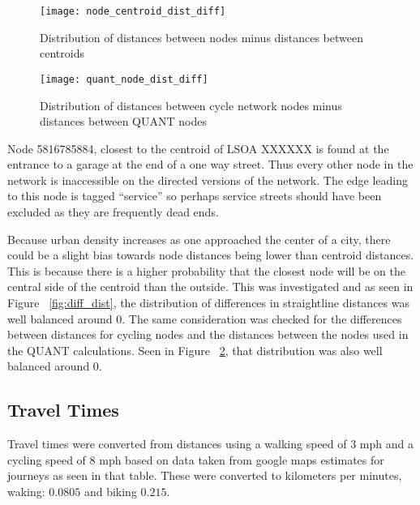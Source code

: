 \begin{figure}
\centering
\texttt{[image: node\_centroid\_dist\_diff]}
\caption{Distribution of distances between nodes minus distances between centroids}
\label{fig:dist_diffs}
\end{figure}

\begin{figure}
\centering
\texttt{[image: quant\_node\_dist\_diff]}
\caption{Distribution of distances between cycle network nodes minus distances between QUANT nodes}
\label{fig:quant_dist_diffs}
\end{figure}

Node 5816785884, closest to the centroid of LSOA XXXXXX is found at the entrance to a garage at the end of a one way street. Thus every other node in the network is inaccessible on the directed versions of the network. The edge leading to this node is tagged ``service'' so perhaps service streets should have been excluded as they are frequently dead ends. 

Because urban density increases as one approached the center of a city, there could be a slight bias towards node distances being lower than centroid distances. This is because there is a higher probability that the closest node will be on the central side of the centroid than the outside. This was investigated and as seen in Figure ~\ref{fig:diff_dist}, the distribution of differences in straightline distances was well balanced around 0. The same consideration was checked for the differences between distances for cycling nodes and the distances between the nodes used in the QUANT calculations. Seen in Figure ~\ref{fig:quant_dist_diffs}, that distribution was also well balanced around 0. 


\subsection{Travel Times}

Travel times were converted from distances using a walking speed of 3 mph and a cycling speed of 8 mph based on data taken from google maps estimates for journeys as seen in that table. These were converted to kilometers per minutes, waking: $0.0805$ and biking $0.215$. 

